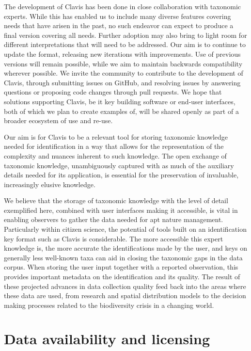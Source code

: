 \documentclass[10pt,letterpaper]{article}
\begin{document}
The development of Clavis has been done in close collaboration with taxonomic experts. While this has enabled us to include many diverse features covering needs that have arisen in the past, no such endeavor can expect to produce a final version covering all needs. Further adoption may also bring to light room for different interpretations that will need to be addressed. Our aim is to continue to update the format, releasing new iterations with improvements. Use of previous versions will remain possible, while we aim to maintain backwards compatibility wherever possible. We invite the community to contribute to the development of Clavis, through submitting issues on GitHub, and resolving issues by answering questions or proposing code changes through pull requests. We hope that solutions supporting Clavis, be it key building software or end-user interfaces, both of which we plan to create examples of, will be shared openly as part of a broader ecosystem of use and re-use.

Our aim is for Clavis to be a relevant tool for storing taxonomic knowledge needed for identification in a way that allows for the representation of the complexity and nuances inherent to such knowledge. The open exchange of taxonomic knowledge, unambiguously captured with as much of the auxiliary details needed for its application, is essential for the preservation of invaluable, increasingly elusive knowledge.

We believe that the storage of taxonomic knowledge with the level of detail exemplified here, combined with user interfaces making it accessible, is vital in enabling observers to gather the data needed for apt nature management. Particularly within citizen science, the potential of tools built on an identification key format such as Clavis is considerable. The more accessible this expert knowledge is, the more accurate the identifications made by the user, and keys on generally less well-known taxa can aid in closing the taxonomic gaps in the data corpus. When storing the user input together with a reported observation, this provides important metadata on the identification and its quality. The result of these projected advances in data collection quality feed back into the areas where these data are used, from research and spatial distribution models to the decision making processes related to the biodiversity crisis in a changing world.

\section*{
Data availability and licensing
}
\end{document}
